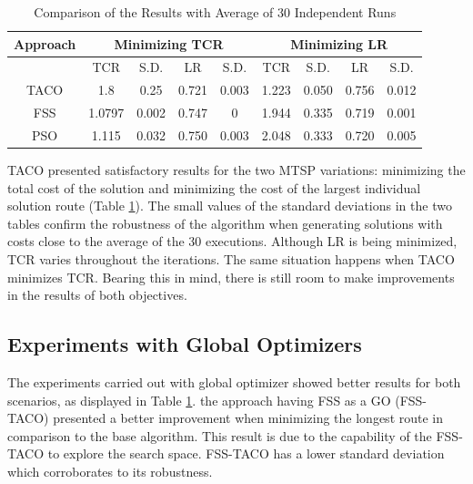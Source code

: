 \documentclass[runningheads]{llncs}
\begin{document}
\begin{table}
    \centering
    \caption{Comparison of the Results with Average of 30 Independent Runs} \label{tab:1}
    \begin{tabular}{|c|c|c|c|c|c|c|c|c|}
        \hline
        \textbf{Approach} & \multicolumn{4}{|c|}{\textbf{Minimizing TCR}} & \multicolumn{4}{|c|}{\textbf{Minimizing LR}}\\
        \hline
        {} & TCR & S.D. & LR & S.D. & TCR & S.D. & LR & S.D.\\
        \hline
        TACO & 1.8 & 0.25 & 0.721 & 0.003 & 1.223 & 0.050 & 0.756 & 0.012\\
        \hline
        FSS	& 1.0797 & 0.002 & 0.747 & 0 & 1.944 & 0.335 & 0.719 & 0.001\\
        \hline
        PSO	& 1.115 & 0.032 & 0.750 & 0.003 & 2.048 & 0.333 & 0.720 & 0.005\\
        \hline
    \end{tabular}
\end{table}

TACO presented satisfactory results for the two MTSP variations: minimizing the total cost of the solution and minimizing the cost of the largest individual solution route (Table \ref{tab:1}). The small values of the standard deviations in the two tables confirm the robustness of the algorithm when generating solutions with costs close to the average of the 30 executions. Although LR is being minimized, TCR varies throughout the iterations. The same situation happens when TACO minimizes TCR. Bearing this in mind, there is still room to make improvements in the results of both objectives.




\subsection{Experiments with Global Optimizers}
The experiments carried out with global optimizer showed better results for both scenarios, as displayed in Table \ref{tab:1}. the approach having FSS as a GO (FSS-TACO) presented a better improvement when minimizing the longest route in comparison to the base algorithm. This result is due to the capability of the FSS-TACO to explore the search space. FSS-TACO has a lower standard deviation which corroborates to its robustness.
\end{document}
